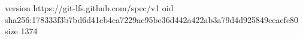 version https://git-lfs.github.com/spec/v1
oid sha256:178333f3b7bd6d41eb4ca7229ac95be36d442a422ab3a79d4d925849ceaefe80
size 1374
